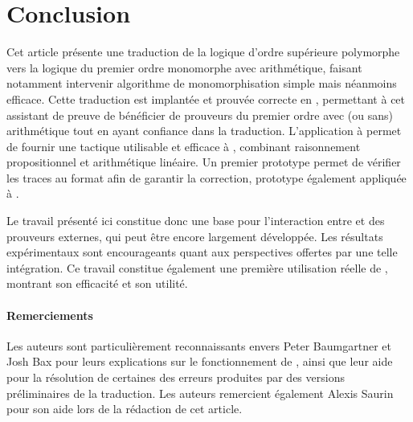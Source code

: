 \section{Conclusion}

Cet article présente une traduction de la logique d'ordre supérieure
polymorphe vers la logique du premier ordre monomorphe avec
arithmétique, faisant notamment intervenir algorithme de
monomorphisation simple mais néanmoins efficace. Cette traduction est
implantée et prouvée correcte en \holfour, permettant à cet assistant de
preuve de bénéficier de prouveurs du premier ordre avec (ou sans)
arithmétique tout en ayant confiance dans la traduction. L'application à
\beagle permet de fournir une tactique utilisable et efficace à
\holfour, combinant raisonnement propositionnel et arithmétique
linéaire. Un premier prototype permet de vérifier les traces au format
\tff afin de garantir la correction, prototype également appliquée à
\beagle.

Le travail présenté ici constitue donc une base pour l'interaction entre
\holfour et des prouveurs externes, qui peut être encore largement
développée. Les résultats expérimentaux sont encourageants quant aux
perspectives offertes par une telle intégration. Ce travail constitue
également une première utilisation réelle de \beagle, montrant son
efficacité et son utilité.


\paragraph{Remerciements}

Les auteurs sont particulièrement reconnaissants envers Peter
Baumgartner et Josh Bax pour leurs explications sur le fonctionnement de
\beagle, ainsi que leur aide pour la résolution de certaines des erreurs
produites par des versions préliminaires de la traduction. Les auteurs
remercient également Alexis Saurin pour son aide lors de la rédaction de
cet article.
